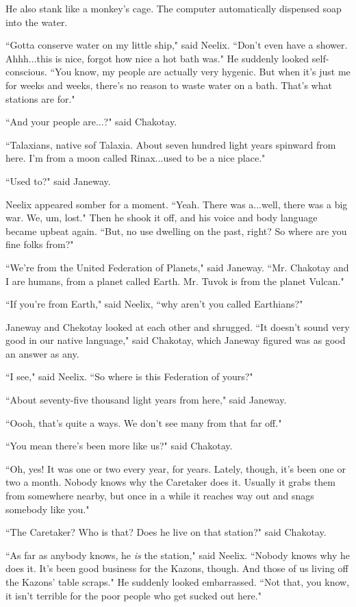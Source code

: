 \documentclass[twoside,letterpaper,12pt]{memoir}
\begin{document}
He also stank like a monkey's cage. The computer automatically dispensed soap into the water.

``Gotta conserve water on my little ship," said Neelix. ``Don't even have a shower. Ahhh...this is nice, forgot how nice a hot bath was." He suddenly looked self-conscious. ``You know, my people are actually very hygenic. But when it's just me for weeks and weeks, there's no reason to waste water on a bath. That's what stations are for."

``And your people are...?" said Chakotay.

``Talaxians, native sof Talaxia. About seven hundred light years spinward from here. I'm from a moon called Rinax...used to be a nice place."

``Used to?" said Janeway.

Neelix appeared somber for a moment. ``Yeah. There was a...well, there was a big war. We, um, lost." Then he shook it off, and his voice and body language became upbeat again. ``But, no use dwelling on the past, right? So where are you fine folks from?"

``We're from the United Federation of Planets," said Janeway. ``Mr. Chakotay and I are humans, from a planet called Earth. Mr. Tuvok is from the planet Vulcan."

``If you're from Earth," said Neelix, ``why aren't you called Earthians?"

Janeway and Chekotay looked at each other and shrugged. ``It doesn't sound very good in our native language," said Chakotay, which Janeway figured was as good an answer as any.

``I see," said Neelix. ``So where is this Federation of yours?"

``About seventy-five thousand light years from here," said Janeway.

``Oooh, that's quite a ways. We don't see many from that far off."

``You mean there's been more like us?" said Chakotay.

``Oh, yes! It was one or two every year, for years. Lately, though, it's been one or two a month. Nobody knows why the Caretaker does it. Usually it grabs them from somewhere nearby, but once in a while it reaches way out and snags somebody like you."

``The Caretaker? Who is that? Does he live on that station?" said Chakotay.

``As far as anybody knows, he \textit{is} the station," said Neelix. ``Nobody knows why he does it. It's been good business for the Kazons, though. And those of us living off the Kazons' table scraps." He suddenly looked embarrassed. ``Not that, you know, it isn't terrible for the poor people who get sucked out here."
\end{document}

